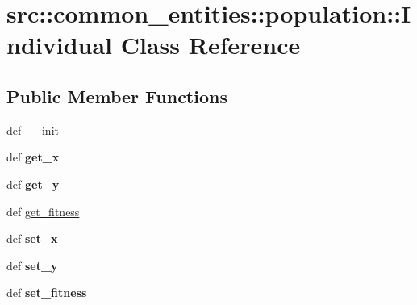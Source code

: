 \hypertarget{classsrc_1_1common__entities_1_1population_1_1Individual}{
\section{src::common\_\-entities::population::Individual Class Reference}
\label{classsrc_1_1common__entities_1_1population_1_1Individual}
}
\subsection*{Public Member Functions}
\begin{DoxyCompactItemize}
\item 
def \hyperlink{classsrc_1_1common__entities_1_1population_1_1Individual_a9fe3a03d334ba468784dd7dd8cf114a4}{\_\-\_\-init\_\-\_\-}
\item 
\hypertarget{classsrc_1_1common__entities_1_1population_1_1Individual_ad520764c5c366fa6c1ff86767136049e}{
def {\bfseries get\_\-x}}
\label{classsrc_1_1common__entities_1_1population_1_1Individual_ad520764c5c366fa6c1ff86767136049e}

\item 
\hypertarget{classsrc_1_1common__entities_1_1population_1_1Individual_a34231d09272cbbfa9fe2490254fe6c2e}{
def {\bfseries get\_\-y}}
\label{classsrc_1_1common__entities_1_1population_1_1Individual_a34231d09272cbbfa9fe2490254fe6c2e}

\item 
def \hyperlink{classsrc_1_1common__entities_1_1population_1_1Individual_a63a9906929ffccf848be80ef4e362173}{get\_\-fitness}
\item 
\hypertarget{classsrc_1_1common__entities_1_1population_1_1Individual_a179e67f69ae0d39a2c95f6b7dd391e24}{
def {\bfseries set\_\-x}}
\label{classsrc_1_1common__entities_1_1population_1_1Individual_a179e67f69ae0d39a2c95f6b7dd391e24}

\item 
\hypertarget{classsrc_1_1common__entities_1_1population_1_1Individual_aec391ba6d3659efdfe54e19e1bfcf1e5}{
def {\bfseries set\_\-y}}
\label{classsrc_1_1common__entities_1_1population_1_1Individual_aec391ba6d3659efdfe54e19e1bfcf1e5}

\item 
\hypertarget{classsrc_1_1common__entities_1_1population_1_1Individual_a552aa086f28b7905ae640b79f8e825f1}{
def {\bfseries set\_\-fitness}}
\label{classsrc_1_1common__entities_1_1population_1_1Individual_a552aa086f28b7905ae640b79f8e825f1}

\end{DoxyCompactItemize}
